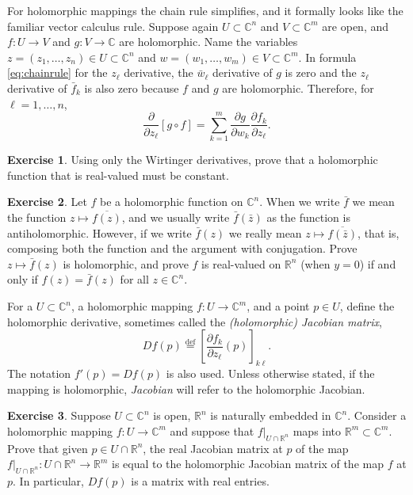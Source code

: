 \documentclass[12pt,openany]{book}
\newcommand{\C}{{\mathbb{C}}}
\newcommand{\R}{{\mathbb{R}}}
\newcommand{\myindex}[1]{#1\index{#1}}
\theoremstyle{plain}
\theoremstyle{remark}
\theoremstyle{definition}
\newenvironment{exbox}{%
    \def\FrameCommand{\vrule width 1pt \relax\hspace{10pt}}%
    \MakeFramed{\advance\hsize-\width\FrameRestore}%
}{%
    \endMakeFramed
}
\theoremstyle{exercise}
\newtheorem{exercise}{Exercise}[section]
\theoremstyle{example}
\begin{document}
For holomorphic mappings the chain rule simplifies, and it formally looks
like the familiar vector calculus rule.
Suppose again
$U \subset \C^n$ and $V \subset \C^m$ are open, and
$f \colon U \to V$ and $g \colon V \to \C$ are holomorphic.
Name the variables
$z = (z_1,\ldots,z_n) \in U \subset \C^n$ and $w = (w_1,\ldots,w_m) \in V
\subset \C^m$.  In formula \eqref{eq:chainrule} for the $z_\ell$ derivative,
the $\bar{w}_\ell$ derivative of $g$ is zero and the $z_\ell$ derivative of
$\bar{f}_k$ is also zero because $f$ and $g$ are holomorphic.
Therefore, for $\ell=1,\ldots,n$,
\begin{equation*}
\frac{\partial}{\partial z_\ell} \left[ g \circ f \right]
=
\sum_{k=1}^m
\frac{\partial g}{\partial w_k}
\frac{\partial f_k}{\partial z_\ell} .
\end{equation*}

\begin{exbox}
\begin{exercise}
Using only the Wirtinger derivatives, prove that a holomorphic function
that is real-valued must be constant.
\end{exercise}

\begin{exercise}
Let $f$ be a holomorphic function on $\C^n$.
When we write $\bar{f}$ we mean the function $z \mapsto \overline{f(z)}$,
and we usually write $\bar{f}(\bar{z})$ as the function is antiholomorphic.
However,
if we write $\bar{f}(z)$ we really mean $z \mapsto \overline{f(\bar{z})}$,
that is, composing both the function and the argument with conjugation.
Prove $z \mapsto \bar{f}(z)$ is holomorphic, and prove $f$ is
real-valued on $\R^n$ (when $y=0$) if and only if $f(z) =
\bar{f}(z)$ for all $z \in \C^n$.
\end{exercise}
\end{exbox}

For a $U \subset \C^n$, a holomorphic mapping $f \colon U \to \C^m$,
and a point $p \in U$,
define the holomorphic derivative, sometimes called the
\emph{(holomorphic) \myindex{Jacobian matrix}},
%
\begin{equation*}
Df(p)
\overset{\text{def}}{=}
\left[
\frac{\partial f_k}{\partial z_\ell} (p)
\right]_{k \ell} .
\end{equation*}
The notation $f'(p) = Df(p)$ is also used.
Unless otherwise stated, if the mapping is holomorphic,
\emph{Jacobian} will refer to the holomorphic Jacobian.

\begin{exbox}
\begin{exercise}
Suppose $U \subset \C^n$ is open, $\R^n$ is naturally embedded in $\C^n$.
Consider a holomorphic mapping $f \colon U \to \C^m$ and suppose that
$f|_{U \cap \R^n}$ maps into $\R^m \subset \C^m$.  Prove that given
$p \in U \cap \R^n$, the real
Jacobian matrix at $p$ of the map
$f|_{U \cap \R^n} \colon U \cap \R^n \to \R^m$ is equal to the holomorphic
Jacobian matrix of the map $f$ at $p$.  In particular, $Df(p)$ is a matrix
with real entries.
\end{exercise}
\end{exbox}
\end{document}
